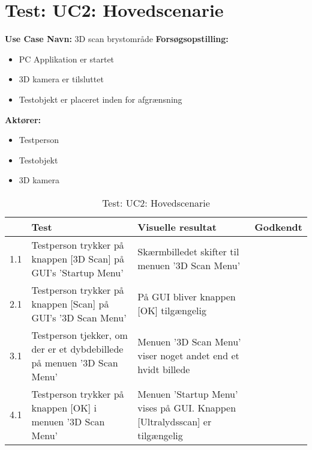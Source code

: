 
\section{Test: UC2: Hovedscenarie}
\textbf{Use Case Navn:} 3D scan brystområde \newline
\textbf{Forsøgsopstilling:}
\begin{itemize}
\item PC Applikation  er startet
\item 3D kamera er tilsluttet
\item Testobjekt er placeret inden for afgrænsning
\end{itemize}  
\textbf{Aktører:}
\begin{itemize}
\item Testperson
\item Testobjekt
\item 3D kamera
\end{itemize}  

\begin{table}[htb]
\begin{tabularx}{\textwidth}{|p{0.5cm}|X|X|p{2cm}|}
\hline
\textbf{} & \textbf{Test} & \textbf{Visuelle resultat} &\textbf{Godkendt} \\\hline
1.1 & Testperson trykker på knappen [3D Scan] på GUI's 'Startup Menu' & Skærmbilledet skifter til menuen '3D Scan Menu' &  \\\hline
2.1 & Testperson trykker på knappen [Scan] på GUI's '3D Scan Menu' & På GUI bliver knappen [OK] tilgængelig &  \\\hline
3.1 & Testperson tjekker, om der er et dybdebillede på menuen '3D Scan Menu' & Menuen '3D Scan Menu' viser noget andet end et hvidt billede & \\\hline
4.1 & Testperson trykker på knappen [OK] i menuen '3D Scan Menu' & Menuen 'Startup Menu' vises på GUI. Knappen [Ultralydsscan] er tilgængelig & \\\hline
\end{tabularx}
    \caption{Test: UC2: Hovedscenarie}
    \label{uc2_test_h_label}  
\end{table}
\newpage


